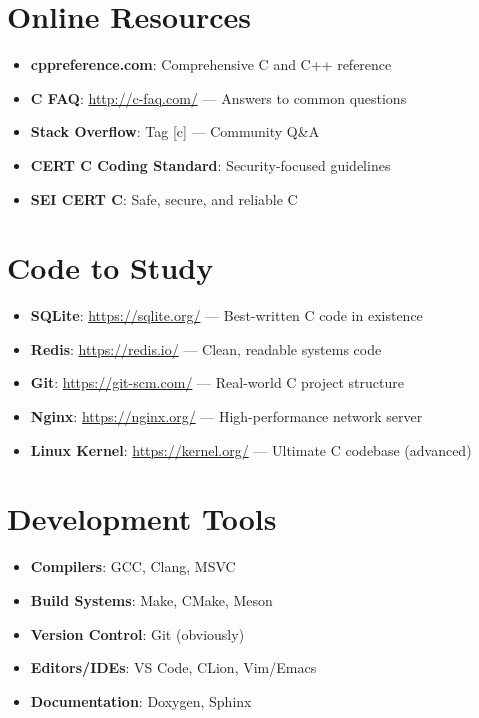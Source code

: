 \documentclass[10pt,openany]{book}
\begin{document}
\section*{Online Resources}

\begin{itemize}
    \item \textbf{cppreference.com}: Comprehensive C and C++ reference
    \item \textbf{C FAQ}: \url{http://c-faq.com/} — Answers to common questions
    \item \textbf{Stack Overflow}: Tag [c] — Community Q\&A
    \item \textbf{CERT C Coding Standard}: Security-focused guidelines
    \item \textbf{SEI CERT C}: Safe, secure, and reliable C
\end{itemize}

\section*{Code to Study}

\begin{itemize}
    \item \textbf{SQLite}: \url{https://sqlite.org/} — Best-written C code in existence
    \item \textbf{Redis}: \url{https://redis.io/} — Clean, readable systems code
    \item \textbf{Git}: \url{https://git-scm.com/} — Real-world C project structure
    \item \textbf{Nginx}: \url{https://nginx.org/} — High-performance network server
    \item \textbf{Linux Kernel}: \url{https://kernel.org/} — Ultimate C codebase (advanced)
\end{itemize}

\section*{Development Tools}

\begin{itemize}
    \item \textbf{Compilers}: GCC, Clang, MSVC
    \item \textbf{Build Systems}: Make, CMake, Meson
    \item \textbf{Version Control}: Git (obviously)
    \item \textbf{Editors/IDEs}: VS Code, CLion, Vim/Emacs
    \item \textbf{Documentation}: Doxygen, Sphinx
\end{itemize}
\end{document}
